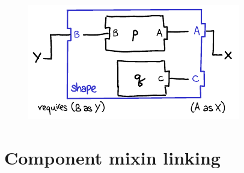 \begin{figure}[H]
\center\includegraphics{figures/mixin-renaming-ex.pdf}
\end{figure}

\section{Component mixin linking}

